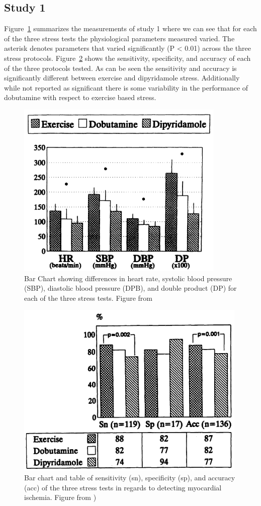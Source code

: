 \documentclass[12pt]{article}
\begin{document}
\subsection{Study 1}
Figure~\ref{p1r1} summarizes the measurements of study 1 where we can see that for each of the three stress tests the physiological parameters measured varied. The asterisk denotes parameters that varied significantly (P < 0.01) across the three stress protocols. Figure~\ref{p1r2} shows the sensitivity, specificity, and accuracy of each of the three protocols tested. As can be seen the sensitivity and accuracy is significantly different between exercise and dipyridamole stress. Additionally while not reported as significant there is some variability in the performance of dobutamine with respect to exercise based stress.
\begin{figure}[H]
	\centering
	\includegraphics[width = (0.8\textwidth)]{Figures/Paper1Result1.png}
	\caption{Bar Chart showing differences in heart rate, systolic blood pressure (SBP), diastolic blood pressure (DPB), and double product (DP) for each of the three stress tests. Figure from \cite{Beleslin1994}}
	\label{p1r1}
\end{figure}

\begin{figure}[H]
	\centering
	\includegraphics[width=(0.8\textwidth)]{Figures/Paper1Result2.png}
	\caption{Bar chart and table of sensitivity (sn), specificity (sp), and accuracy (acc) of the three stress tests in regards to detecting myocardial ischemia. Figure from \cite{Beleslin1994})}
	\label{p1r2}
\end{figure}
\end{document}

